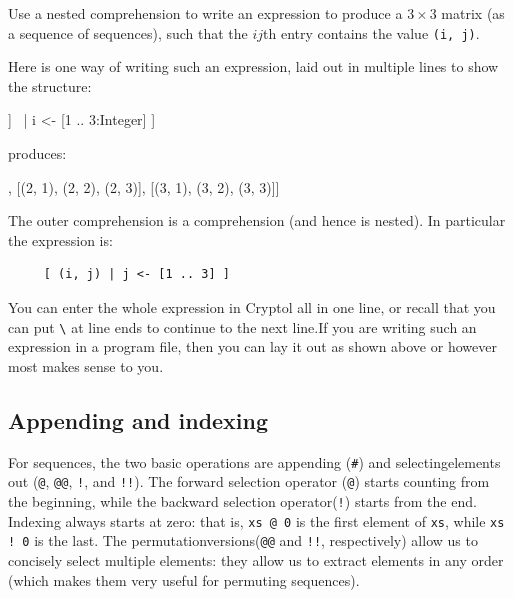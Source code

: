 \begin{Exercise}\label{ex:seq:6}
  Use a nested comprehension to write an expression to produce a
  $3\times3$ matrix (as a sequence of sequences), such that the $ij$th
  entry contains the value {\tt (i, j)}.
\end{Exercise}
\begin{Answer}
  Here is one way of writing such an expression, laid out in multiple
  lines to show the structure:
\restartrepl
\begin{replinVerb}
  [ [ (i, j) | j <- [1 .. 3:Integer] ] \
             | i <- [1 .. 3:Integer] ]
\end{replinVerb}
  produces:
\begin{reploutVerb}
  [[(1, 1), (1, 2), (1, 3)], [(2, 1), (2, 2), (2, 3)],
   [(3, 1), (3, 2), (3, 3)]]
\end{reploutVerb}
The outer comprehension is a comprehension (and hence is nested). In
particular the expression is:
\begin{Verbatim}
     [ (i, j) | j <- [1 .. 3] ]
\end{Verbatim}
You can enter the whole expression in Cryptol all in one line, or
recall that you can put \texttt{\textbackslash} at line ends to continue to
the next line.\indLineCont If you are writing such an expression in a
program file, then you can lay it out as shown above or however most
makes sense to you.
\end{Answer}

\subsection{Appending and indexing}
\label{sec:appending-indexing}

For sequences, the two basic operations are appending\indAppend
(\texttt{\#}) and selecting\indIndex elements out (\texttt{@},
\texttt{@@}, \texttt{!}, and \texttt{!!}). The forward selection
operator (\texttt{@}) starts counting from the beginning, while the
backward selection operator\indRIndex (\texttt{!}) starts from the
end. Indexing always starts at zero: that is, \texttt{xs @ 0} is the
first element of \texttt{xs}, while \texttt{xs !\ 0} is the last. The
permutation\indIndexs versions\indRIndexs (\texttt{@@} and
\texttt{!!}, respectively) allow us to concisely select multiple
elements: they allow us to extract elements in any order (which makes
them very useful for permuting sequences).

